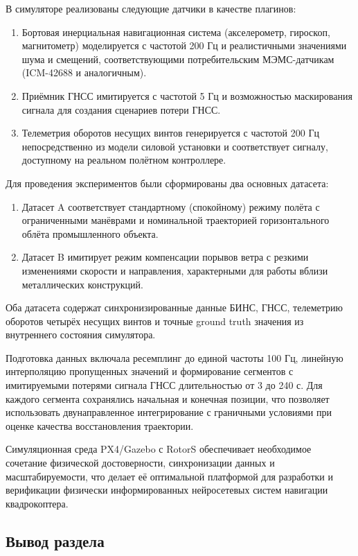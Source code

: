 В симуляторе реализованы следующие датчики в качестве плагинов:
\begin{enumerate}
	\item Бортовая инерциальная навигационная система (акселерометр, гироскоп, магнитометр) моделируется с частотой 200 Гц и реалистичными значениями шума и смещений, соответствующими потребительским МЭМС-датчикам (ICM-42688 и аналогичным).
	\item Приёмник ГНСС имитируется с частотой 5 Гц и возможностью маскирования сигнала для создания сценариев потери ГНСС.
	\item Телеметрия оборотов несущих винтов генерируется с частотой 200 Гц непосредственно из модели силовой установки и соответствует сигналу, доступному на реальном полётном контроллере.
\end{enumerate}

Для проведения экспериментов были сформированы два основных датасета:
\begin{enumerate}
	\item Датасет A соответствует стандартному (спокойному) режиму полёта с ограниченными манёврами и номинальной траекторией горизонтального облёта промышленного объекта.
	\item Датасет B имитирует режим компенсации порывов ветра с резкими изменениями скорости и направления, характерными для работы вблизи металлических конструкций. 
\end{enumerate}

Оба датасета содержат синхронизированные данные БИНС, ГНСС, телеметрию оборотов четырёх несущих винтов и точные ground truth значения из внутреннего состояния симулятора.

Подготовка данных включала ресемплинг до единой частоты 100 Гц, линейную интерполяцию пропущенных значений и формирование сегментов с имитируемыми потерями сигнала ГНСС длительностью от 3 до 240 с. Для каждого сегмента сохранялись начальная и конечная позиции, что позволяет использовать двунаправленное интегрирование с граничными условиями при оценке качества восстановления траектории.

Симуляционная среда PX4/Gazebo с RotorS обеспечивает необходимое сочетание физической достоверности, синхронизации данных и масштабируемости, что делает её оптимальной платформой для разработки и верификации физически информированных нейросетевых систем навигации квадрокоптера.



\subsection{Вывод раздела}

